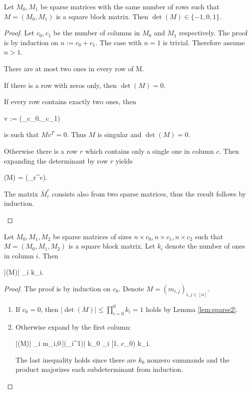 \begin{lem}
\label{lem:sparse2}
Let $M_0,M_1$ be sparse matrices with the same number of rows such that $M = (M_0,M_1)$ is a square block matrix. Then $\det(M) \in \{-1,0,1\}$.
\end{lem}
\begin{proof}
Let $c_0,c_1$ be the number of columns in $M_0$ and $M_1$ respectively. The proof is by induction on $n := c_0+c_1$. The case with $n=1$ is trivial. Therefore assume $n>1$.

There are at most two ones in every row of M.
\begin{cosyitemize}
	\item If there is a row with zeros only, then $\det(M) = 0$.
	\item If every row contains exactly two ones, then
		\begin{cosyeqnarray}
			v := (_{c_0},_{c_1}) \nonumber
		\end{cosyeqnarray}%
		is such that $Mv^T = 0$. Thus $M$ is singular and $\det(M) = 0$.
	\item Otherwise there is a row $r$ which contains only a single one in column $c$. Then expanding the determinant by row $r$ yields
	 \begin{cosyeqnarray}
	 	\det(M) = \pm \det(_r^c).
	 \end{cosyeqnarray}%
	The matrix $\overbar{M}_r^c$ consists also from two sparse matrices, thus the result follows by induction.
\end{cosyitemize}
\end{proof}

\begin{lem}
\label{lem:sparse3}
Let $M_0,M_1,M_2$ be sparse matrices of sizes $n \times c_0, n \times c_1, n \times c_2$ such that $M = (M_0,M_1,M_2)$ is a square block matrix. Let $k_i$ denote the number of ones in column $i$. Then
\begin{cosyeqnarray}
	|\det(M)| \leq \prod_{i \in [c_0]} k_i.
\end{cosyeqnarray}%
\end{lem}
\begin{proof}
The proof is by induction on $c_0$. Denote $M = (m_{i,j})_{i,j \in[n]}$.
\begin{enumerate}
	\item If $c_0 = 0$, then $|\det(M)| \leq \prod_{i=0}^{0} k_i = 1$ holds by Lemma \ref{lem:sparse2}.
	\item Otherwise expand by the first column:
	\begin{cosyeqnarray}
		|\det(M)| \leq \sum_{i\in[n]} m_{i,0}\,|\det(_i^1)| \leq k_0 \prod_{i \in [1, c_0)} k_i.
	\end{cosyeqnarray}%
	The last inequality holds since there are $k_0$ nonzero summands and the product majorizes each subdeterminant from induction.
\end{enumerate}
\end{proof}

